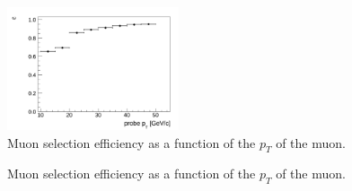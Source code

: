 \begin{figure}[!htbp]
\begin{center}
\includegraphics[width=0.45\textwidth]{figures/MuonEff_VsPt.pdf}
\caption{Muon selection efficiency as a function of the $p_{T}$ of the muon.}
\label{fig:mu_selectionEfficiency_VsPt}
\end{center}
\end{figure}


\begin{figure}[!htbp]
\begin{center}
\caption{Muon selection efficiency as a function of the $p_{T}$ of the muon.}
\label{fig:mu_selectionEfficiency_VsEta}
\end{center}
\end{figure}



